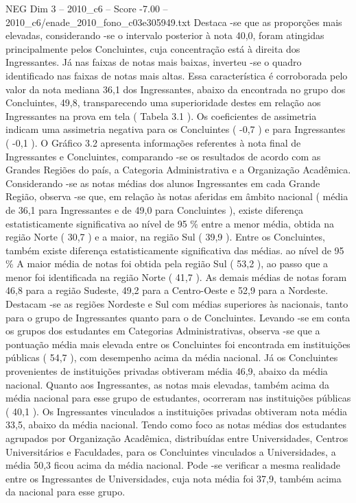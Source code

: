 \begin{textsample}{NEG Dim 3 – 2010\_c6 – Score -7.00 – 2010\_c6/enade\_2010\_fono\_c03e305949.txt}
Destaca -se que as proporções mais elevadas, considerando -se o intervalo posterior à nota 40,0, foram atingidas principalmente pelos Concluintes, cuja concentração está à direita dos Ingressantes.
Já nas faixas de notas mais baixas, inverteu -se o quadro identificado nas faixas de notas mais altas.
Essa característica é corroborada pelo valor da nota mediana 36,1 dos Ingressantes, abaixo da encontrada no grupo dos Concluintes, 49,8, transparecendo uma superioridade destes em relação aos Ingressantes na prova em tela ( Tabela 3.1 ).
Os coeficientes de assimetria indicam uma assimetria negativa para os Concluintes ( -0,7 ) e para Ingressantes ( -0,1 ).
O Gráfico 3.2 apresenta informações referentes à nota final de Ingressantes e Concluintes, comparando -se os resultados de acordo com as Grandes Regiões do país, a Categoria Administrativa e a Organização Acadêmica.
Considerando -se as notas médias dos alunos Ingressantes em cada Grande Região, observa -se que, em relação às notas aferidas em âmbito nacional ( média de 36,1 para Ingressantes e de 49,0 para Concluintes ), existe diferença estatisticamente significativa ao nível de 95 \% entre a menor média, obtida na região Norte ( 30,7 ) e a maior, na região Sul ( 39,9 ).
Entre os Concluintes, também existe diferença estatisticamente significativa das médias. ao nível de 95 \% A maior média de notas foi obtida pela região Sul ( 53,2 ), ao passo que a menor foi identificada na região Norte ( 41,7 ).
As demais médias de notas foram 46,8 para a região Sudeste, 49,2 para a Centro-Oeste e 52,9 para a Nordeste.
Destacam -se as regiões Nordeste e Sul com médias superiores às nacionais, tanto para o grupo de Ingressantes quanto para o de Concluintes.
Levando -se em conta os grupos dos estudantes em Categorias Administrativas, observa -se que a pontuação média mais elevada entre os Concluintes foi encontrada em instituições públicas ( 54,7 ), com desempenho acima da média nacional.
Já os Concluintes provenientes de instituições privadas obtiveram média 46,9, abaixo da média nacional.
Quanto aos Ingressantes, as notas mais elevadas, também acima da média nacional para esse grupo de estudantes, ocorreram nas instituições públicas ( 40,1 ).
Os Ingressantes vinculados a instituições privadas obtiveram nota média 33,5, abaixo da média nacional.
Tendo como foco as notas médias dos estudantes agrupados por Organização Acadêmica, distribuídas entre Universidades, Centros Universitários e Faculdades, para os Concluintes vinculados a Universidades, a média 50,3 ficou acima da média nacional.
Pode -se verificar a mesma realidade entre os Ingressantes de Universidades, cuja nota média foi 37,9, também acima da nacional para esse grupo.

\end{textsample}
